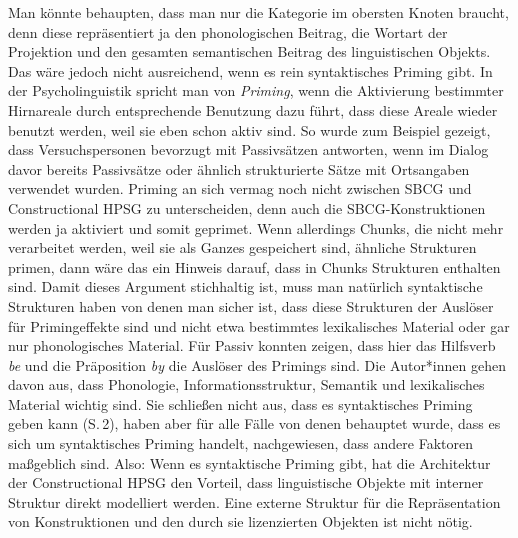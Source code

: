 Man könnte behaupten, dass man nur die Kategorie im obersten Knoten braucht, denn diese
repräsentiert ja den phonologischen Beitrag, die Wortart der Projektion und den gesamten
semantischen Beitrag des linguistischen Objekts. Das wäre jedoch nicht ausreichend, wenn es rein
syntaktisches Priming gibt. In der Psycholinguistik spricht man von \emph{Priming}, wenn die
Aktivierung bestimmter Hirnareale durch entsprechende Benutzung dazu führt, dass diese Areale wieder
benutzt werden, weil sie eben schon aktiv sind. So wurde zum Beispiel gezeigt, dass Versuchspersonen
bevorzugt mit Passivsätzen antworten, wenn im Dialog davor bereits Passivsätze oder ähnlich
strukturierte Sätze mit Ortsangaben verwendet wurden. Priming an sich vermag noch nicht zwischen SBCG und Constructional HPSG zu unterscheiden,
denn auch die SBCG-Konstruktionen werden ja aktiviert und somit geprimet. Wenn allerdings Chunks,
die nicht mehr verarbeitet werden, weil sie als Ganzes gespeichert sind, ähnliche Strukturen primen,
dann wäre das ein Hinweis darauf, dass in Chunks Strukturen enthalten sind. Damit dieses Argument
stichhaltig ist, muss man natürlich syntaktische Strukturen haben von denen man sicher ist, dass
diese Strukturen der Auslöser für Primingeffekte sind und nicht etwa bestimmtes lexikalisches
Material oder gar nur phonologisches Material. Für Passiv konnten \citet*{ZBGS2019a} zeigen, dass hier das
Hilfsverb \emph{be} und die Präposition \emph{by} die Auslöser des Primings sind. Die Autor*innen
gehen davon aus, dass Phonologie, Informationsstruktur, Semantik und lexikalisches Material wichtig
sind. Sie schließen nicht aus, dass es syntaktisches Priming geben kann (S.\,2), haben aber für alle Fälle
von denen behauptet wurde, dass es sich um syntaktisches Priming handelt, nachgewiesen, dass andere
Faktoren maßgeblich sind. Also: Wenn es syntaktische Priming gibt, hat die Architektur der
Constructional HPSG den Vorteil, dass linguistische Objekte mit interner Struktur direkt modelliert
werden. Eine externe Struktur für die Repräsentation von Konstruktionen und den durch sie
lizenzierten Objekten ist nicht nötig.
\enlargethispage{4pt}

